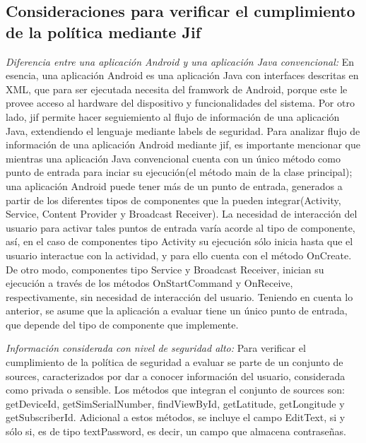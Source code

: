 \subsection{Consideraciones para verificar el cumplimiento de la política
mediante Jif} 
\textit{Diferencia entre una aplicación Android y una aplicación Java
convencional:}\newline 
En esencia, una aplicación Android es una aplicación Java con interfaces
descritas en XML, que para ser ejecutada necesita del framwork de Android,
porque este le provee acceso al hardware del dispositivo y funcionalidades del
sistema.\newline 
Por otro lado, jif permite hacer seguiemiento al flujo de información de una
aplicación Java, extendiendo el lenguaje mediante labels de seguridad.\newline
Para analizar flujo de información de una aplicación Android mediante
jif, es importante mencionar que mientras una aplicación Java convencional
cuenta con un único método como punto de entrada para inciar su ejecución(el
método main de la clase principal); una aplicación Android puede tener más de un
punto de entrada, generados a partir de los diferentes tipos de componentes que
la pueden integrar(Activity, Service, Content Provider y Broadcast
Receiver). La necesidad de interacción del usuario para activar tales puntos de
entrada varía acorde al tipo de componente, así, en el caso de componentes tipo
Activity su ejecución sólo inicia hasta que el usuario interactue con la
actividad, y para ello cuenta con el método OnCreate. De otro modo, componentes
tipo Service y Broadcast Receiver, inician su ejecución a través de los métodos
OnStartCommand y OnReceive, respectivamente, sin necesidad de interacción del
usuario.\newline 
{ \color{red} {Teniendo en cuenta lo anterior, se asume que la aplicación a
evaluar tiene un único punto de entrada, que depende del tipo de componente que
implemente.} }

\textit{Información considerada con nivel de seguridad alto:}\newline
Para verificar el cumplimiento de la política de seguridad a evaluar se parte de
un conjunto de sources, caracterizados por dar a conocer información del
usuario, considerada como privada o sensible. Los métodos que integran el
conjunto de sources son: getDeviceId, getSimSerialNumber, findViewById,
getLatitude, getLongitude y getSubscriberId. Adicional a estos métodos, se
incluye el campo EditText, si y sólo si, es de tipo textPassword, es decir, un
campo que almacena contraseñas.


